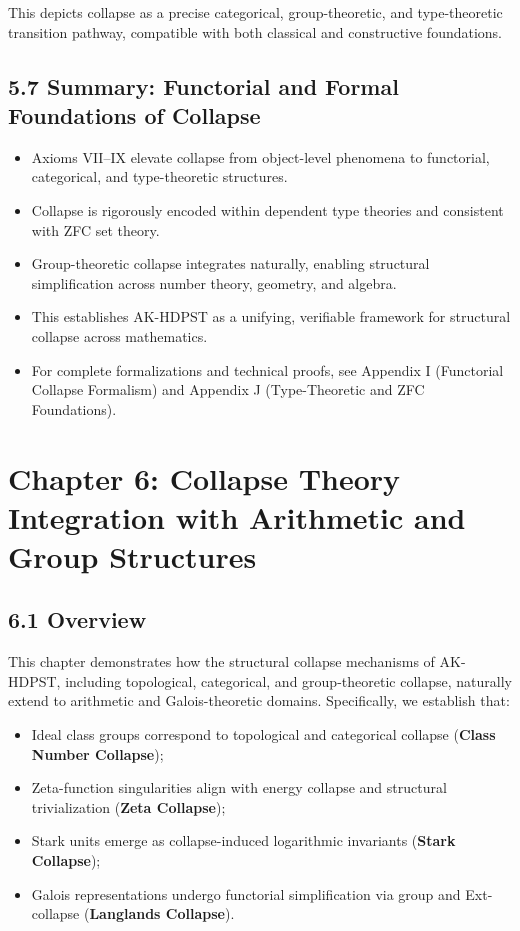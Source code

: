 \documentclass[11pt]{article}
\begin{document}
This depicts collapse as a precise categorical, group-theoretic, and type-theoretic transition pathway, compatible with both classical and constructive foundations.

\subsection*{5.7 Summary: Functorial and Formal Foundations of Collapse}

\begin{itemize}
    \item Axioms VII–IX elevate collapse from object-level phenomena to functorial, categorical, and type-theoretic structures.
    \item Collapse is rigorously encoded within dependent type theories and consistent with ZFC set theory.
    \item Group-theoretic collapse integrates naturally, enabling structural simplification across number theory, geometry, and algebra.
    \item This establishes AK-HDPST as a unifying, verifiable framework for structural collapse across mathematics.
    \item For complete formalizations and technical proofs, see Appendix I (Functorial Collapse Formalism) and Appendix J (Type-Theoretic and ZFC Foundations).
\end{itemize}



\section{Chapter 6: Collapse Theory Integration with Arithmetic and Group Structures}

\subsection*{6.1 Overview}

This chapter demonstrates how the structural collapse mechanisms of AK-HDPST, including topological, categorical, and group-theoretic collapse, naturally extend to arithmetic and Galois-theoretic domains. Specifically, we establish that:

\begin{itemize}
    \item Ideal class groups correspond to topological and categorical collapse (\textbf{Class Number Collapse});
    \item Zeta-function singularities align with energy collapse and structural trivialization (\textbf{Zeta Collapse});
    \item Stark units emerge as collapse-induced logarithmic invariants (\textbf{Stark Collapse});
    \item Galois representations undergo functorial simplification via group and Ext-collapse (\textbf{Langlands Collapse}).
\end{itemize}
\end{document}
